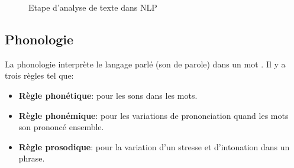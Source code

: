 \begin{figure}[htbp]
    \begin{center}
        \caption{Etape d'analyse de texte dans NLP \citep{handbook-nlp}}
    \end{center}
    \label{nlp-stage}
\end{figure}

\subsection{Phonologie}
La phonologie interprète le langage parlé (son de parole) dans un mot \citep{natural-language-processing}. Il y a trois règles tel que:
\begin{itemize}
    \item \textbf{Règle phonétique}: pour les sons dans les mots.
    \item \textbf{Règle phonémique}: pour les variations de prononciation quand les mots son prononcé ensemble.
    \item \textbf{Règle prosodique}: pour la variation d'un stresse et d'intonation dans un phrase.
\end{itemize}

